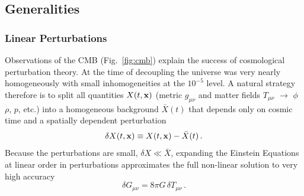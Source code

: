 \documentclass[12pt,letterpaper,rotate]{article}
\def\beq{\begin{equation}}
\def\eeq{\end{equation}}
\begin{document}
{%





\subsection{Generalities}

\subsubsection{Linear Perturbations}
Observations of the CMB (Fig.~\ref{fig:cmb}) explain the success of cosmological perturbation theory.
At the time of decoupling the universe was very nearly homogeneously with small inhomogeneities at the $10^{-5}$ level.
A natural strategy therefore is to split all quantities $X(t, {\bf x})$ (metric $g_{\mu \nu}$ and matter fields $T_{\mu \nu}$ $\to$ $\phi$ $\rho$, $p$, etc.) into a homogeneous background $\bar X(t)$ that depends only on cosmic time and a spatially dependent perturbation
\beq
\label{equ:pert}
\delta X(t, {\bf x}) \equiv X(t, {\bf x}) - \bar X(t)\, .
\eeq
Because the perturbations are small, $\delta X \ll \bar X$, expanding the Einstein Equations at linear order in perturbations approximates the full non-linear solution to very high accuracy
\beq
\delta G_{\mu \nu} = 8\pi G\, \delta T_{\mu \nu}\, .
\eeq



}
\end{document}

